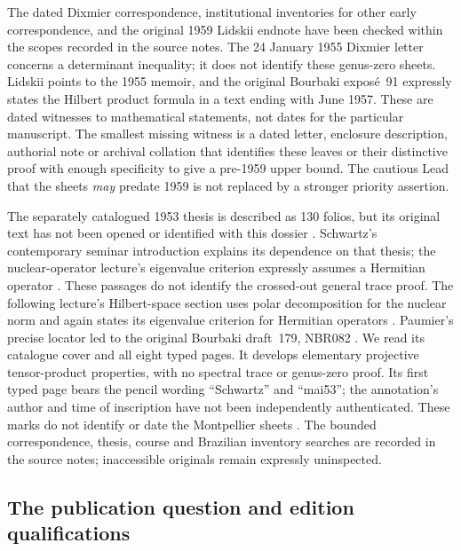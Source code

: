 The dated Dixmier correspondence, institutional inventories for other
early correspondence, and the original 1959 Lidskii endnote have
been checked within the scopes recorded in the source notes. The
24 January 1955 Dixmier letter concerns a determinant inequality;
it does not identify these genus-zero sheets. Lidskii points to the
1955 memoir, and the original Bourbaki expos\'e~91 expressly states
the Hilbert product formula in a text ending with June 1957. These
are dated witnesses to mathematical statements, not dates for the
particular manuscript. The smallest missing witness is a dated
letter, enclosure description, authorial note or archival collation
that identifies these leaves or their distinctive proof with enough
specificity to give a pre-1959 upper bound. The cautious Lead that
the sheets \emph{may} predate 1959 is not replaced by a stronger
priority assertion.

The separately catalogued 1953 thesis is described as 130 folios, but its
original text has not been opened or identified with this dossier
\cite{rootGrothendieckThesisCatalogue1953}. Schwartz's contemporary seminar
introduction explains its dependence on that thesis; the nuclear-operator
lecture's eigenvalue criterion expressly assumes a Hermitian operator
\cite[p.~III]{rootSchwartzSeminarIntroduction1954}
\cite[expos\'e~12, p.~3]{rootSchwartzNuclear1954}. These passages do not
identify the crossed-out general trace proof. The following lecture's
Hilbert-space section uses polar decomposition for the nuclear norm and
again states its eigenvalue criterion for Hermitian operators
\cite[expos\'e~13, \S3, pp.~3--5]{rootSchwartzNuclearCases1954}.
Paumier's precise locator led to the original Bourbaki draft~179,
NBR082 \cite[p.~64, note~73]{rootPaumierSchwartz2014}.
We read its catalogue cover and all eight typed pages. It develops
elementary projective tensor-product properties, with no spectral trace
or genus-zero proof. Its first typed page bears the pencil wording
``Schwartz'' and ``mai53''; the annotation's author and time of inscription
have not been independently authenticated. These marks do not identify
or date the Montpellier sheets \cite{catBourbaki179}. The bounded correspondence,
thesis, course and Brazilian inventory searches are recorded in the
source notes; inaccessible originals remain expressly uninspected.

\subsection{The publication question and edition qualifications}


